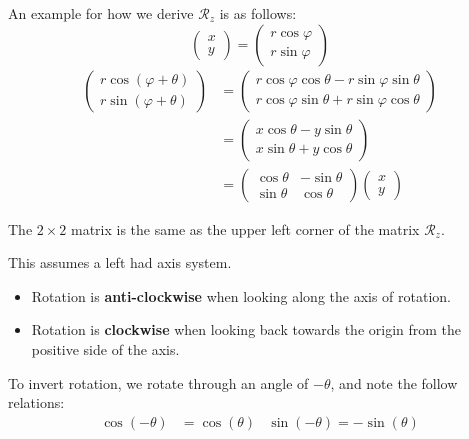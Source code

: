 \documentclass[11pt]{article}
\begin{document}
An example for how we derive $\mathcal{R}_z$ is as follows:
\[
  \begin{pmatrix}
    x \\
    y
  \end{pmatrix}
  =
  \begin{pmatrix}
    r \cos \varphi \\
    r \sin \varphi
  \end{pmatrix}
\]
\begin{align*}
  \begin{pmatrix}
    r \cos (\varphi + \theta) \\
    r \sin (\varphi + \theta)
  \end{pmatrix}
  &=
  \begin{pmatrix}
    r \cos \varphi \cos \theta - r \sin \varphi \sin \theta \\
    r \cos \varphi \sin \theta + r \sin \varphi \cos \theta
  \end{pmatrix} \\
  &=
  \begin{pmatrix}
    x \cos \theta - y \sin \theta \\
    x \sin \theta + y \cos \theta
  \end{pmatrix} \\
  &=
  \begin{pmatrix}
    \cos \theta & - \sin \theta \\
    \sin \theta & \cos \theta
  \end{pmatrix}
  \begin{pmatrix}
    x \\
    y
  \end{pmatrix}
\end{align*}

The $2 \times 2$ matrix is the same as the upper left corner of the matrix $\mathcal{R}_z$.

This assumes a left had axis system.
\begin{itemize}
  \item Rotation is \textbf{anti-clockwise} when looking along the axis of rotation.
  \item Rotation is \textbf{clockwise} when looking back towards the origin from the positive side of the axis.
\end{itemize}

To invert rotation, we rotate through an angle of $- \theta$, and note the follow relations:
\begin{align*}
  \cos(-\theta) &= \cos(\theta) & \sin(-\theta)=-\sin(\theta)
\end{align*}
\end{document}
